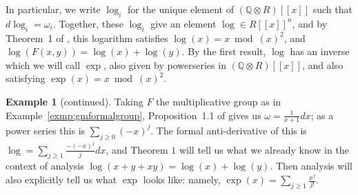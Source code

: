\documentclass[12pt]{article}
\newcommand{\Q}{\mathbb{Q}}
\newcommand{\tensor}{\otimes}
\theoremstyle{plain}
\theoremstyle{definition}
\newtheorem{exmp}[thm]{Example} %
\theoremstyle{remark}
\begin{document}
In particular, we write $\log_i$ for the unique element of $(\Q\tensor R)[[x]]$ such that $d\log_i = \omega_i$. Together, these $\log_i$ give an element $\log \in R[[x]]^n$, and by Theorem~1 of \citep{honda70}, this logarithm satisfies $\log(x) = x \bmod (x)^2$, and $\log(F(x,y)) = \log(x)+\log(y)$. By the first result, $\log$ has an inverse which we will call $\exp$, also given by powerseries in $(\Q\tensor R)[[x]]$, and also satisfying $\exp(x) = x \bmod (x)^2$.
\addtocounter{thm}{-1}
\begin{exmp}[continued]
Taking $F$ the multiplicative group as in Example~\ref{exmp:gmformalgroup}, Proposition~1.1 of \citep{honda70} gives us $\omega = \frac{1}{x+1}dx$; as a power series this is $\sum_{j \geq 0} (-x)^j$. The formal anti-derivative of this is $\log = \sum_{j \geq 1} \frac{-(-x)^j}{j}dx$, and Theorem $1$ will tell us what we already know in the context of analysis $\log(x + y + xy) = \log(x)+\log(y)$. Then analysis will also explicitly tell us what $\exp$ looks like: namely, $\exp(x) = \sum_{j \geq 1} \frac{x^j}{j!}$.
\end{exmp}
\addtocounter{thm}{2}
\end{document}
